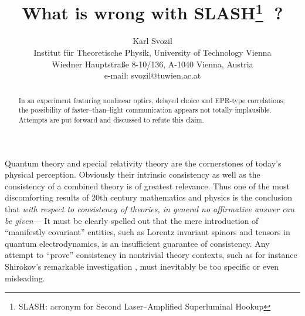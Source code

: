 \RequirePackage{graphicx}
 \RequirePackage{times}
\RequirePackage{mathptm}


\sloppy
\title{What is wrong with SLASH\thanks{SLASH: acronym for Second
 Laser--Amplified Superluminal Hookup}$\;$  ?}
\author{Karl Svozil\\
 {\small Institut f\"ur Theoretische Physik, University of Technology Vienna }     \\
  {\small Wiedner Hauptstra\ss e 8-10/136,}
  {\small A-1040 Vienna, Austria   }            \\
  {\small e-mail: svozil@tuwien.ac.at}}
\maketitle


\date{ }
\maketitle

\begin{abstract}
 In an experiment featuring
 nonlinear optics, delayed choice and EPR-type correlations,
the possibility of faster--than--light communication appears not totally implausible.
 Attempts are put forward and discussed to refute this claim.
\end{abstract}

 Quantum theory and special relativity theory are the cornerstones
 of today's physical perception.
 Obviously their intrinsic consistency as well as the consistency of a
 combined theory is of greatest relevance.
 Thus one of the most discomforting results of 20th century mathematics and physics
 is the conclusion that {\em with respect to consistency of theories,
 in general no affirmative answer can be given}---
 It must be clearly spelled out that the mere introduction of
 ``manifestly covariant'' entities, such as Lorentz invariant
 spinors and tensors
 in  quantum electrodynamics, is an
 insufficient guarantee of consistency.
 Any attempt to ``prove'' consistency in nontrivial theory contexts,
such as for instance Shirokov's
 remarkable investigation \cite{shirokov},
 must inevitably be too specific or even misleading.

